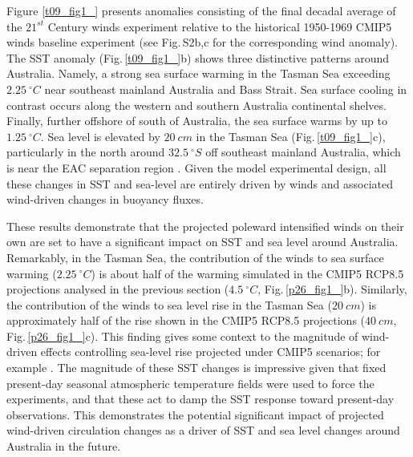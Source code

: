 \documentclass[draft,linenumbers]{agujournal2018}
\begin{document}
Figure \ref{t09_fig1_} presents anomalies consisting of the final decadal average of the $21^{st}$ Century winds experiment relative to the historical 1950-1969 CMIP5 winds baseline experiment (see Fig.\,S2b,c for the corresponding wind anomaly). The SST anomaly (Fig.\,\ref{t09_fig1_}b) shows three distinctive patterns around Australia. Namely, a strong sea surface warming in the Tasman Sea exceeding $2.25\ ^{\circ}C$ near southeast mainland Australia and Bass Strait. Sea surface cooling in contrast occurs along the western and southern Australia continental shelves. Finally, further offshore of south of Australia, the sea surface warms by up to $1.25\ ^{\circ}C$. Sea level is elevated by $20\ cm$ in the Tasman Sea (Fig.\,\ref{t09_fig1_}c), particularly in the north around $32.5\ ^{\circ}S$ off southeast mainland Australia, which is near the EAC separation region \citep{Godfrey1980}. Given the model experimental design, all these changes in SST and sea-level are entirely driven by winds and associated wind-driven changes in buoyancy fluxes.

These results demonstrate that the projected poleward intensified winds on their own are set to have a significant impact on SST and sea level around Australia. Remarkably, in the Tasman Sea, the contribution of the winds to sea surface warming ($2.25\ ^{\circ}C$) is about half of the warming simulated in the CMIP5 RCP8.5 projections analysed in the previous section ($4.5\ ^{\circ}C$, Fig.\,\ref{p26_fig1_}b). Similarly, the contribution of the winds to sea level rise in the Tasman Sea ($20\ cm$) is approximately half of the rise shown in the CMIP5 RCP8.5 projections ($40\ cm$, Fig.\,\ref{p26_fig1_}c). This finding gives some context to the magnitude of wind-driven effects controlling sea-level rise projected under CMIP5 scenarios; for example \citet{Zhang2017}. The magnitude of these SST changes is impressive given that fixed present-day seasonal atmospheric temperature fields were used to force the experiments, and that these act to damp the SST response toward present-day observations. This demonstrates the potential significant impact of projected wind-driven circulation changes as a driver of SST and sea level changes around Australia in the future.
\end{document}
